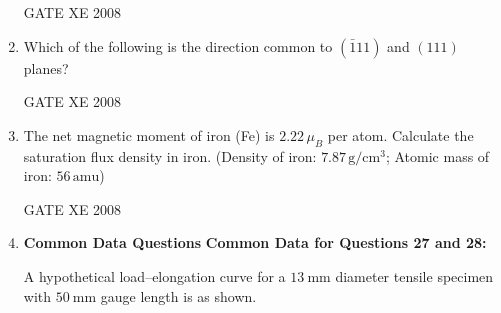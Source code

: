 \documentclass[12pt]{article}
\begin{document}
\begin{enumerate}
\begin{enumerate}
\end{enumerate}

GATE XE 2008

\item Which of the following is the direction common to $(\bar{1}11)$ and $(111)$ planes?

\begin{enumerate}
\end{enumerate}

GATE XE 2008

\item The net magnetic moment of iron (Fe) is $2.22 \, \mu_B$ per atom. Calculate the saturation flux density in iron. (Density of iron: $7.87 \, \mathrm{g/cm^3}$; Atomic mass of iron: $56 \, \mathrm{amu}$)

\begin{enumerate}
\end{enumerate}

GATE XE 2008



\item[] \textbf{\Large Common Data Questions}
\textbf{Common Data for Questions 27 and 28:}

A hypothetical load–elongation curve for a $13 \ \mathrm{mm}$ diameter tensile specimen with $50 \ \mathrm{mm}$ gauge length is as shown.


\end{enumerate}
\end{document}
